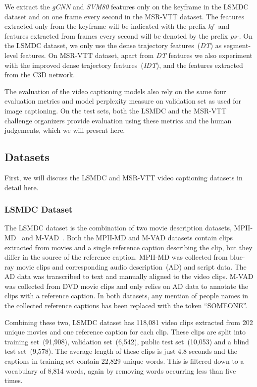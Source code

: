 We extract the \emph{gCNN} and \emph{SVM80} features only on the keyframe in the LSMDC
dataset and on one frame every second in the MSR-VTT dataset.
The features extracted only from the keyframe will be indicated with the prefix
\emph{kf-} and features extracted from frames every second will be denoted by
the prefix \emph{ps-}.
On the LSMDC dataset, we only use the dense trajectory features~(\emph{DT}) as
segment-level features.
On MSR-VTT dataset, apart from \emph{DT} features we also experiment with
the improved dense trajectory features~(\emph{IDT}), and the features extracted from
the C3D network.

The evaluation of the video captioning models also rely on the same four
evaluation metrics and model perplexity measure on validation set as used for
image captioning. 
On the test sets, both the LSMDC and the MSR-VTT challenge organizers provide
evaluation using these metrics and the human judgements, which we will present
here.

\subsection{Datasets}
First, we will discuss the LSMDC and MSR-VTT video captioning datasets in detail
here.
\subsubsection{LSMDC Dataset}
\label{subsec:LsmdcData}
The LSMDC dataset is the combination of two movie description datasets,
MPII-MD~\cite{rohrbach15cvpr} and M-VAD~\cite{AtorabiM-VAD2015}.
Both the MPII-MD and M-VAD datasets contain clips extracted from movies and a
single reference caption describing the clip, but they differ in the source of
the reference caption.
MPII-MD was collected from blue-ray movie clips and corresponding audio
description~(AD) and script data.
The AD data was transcribed to text and manually aligned to the video clips.
M-VAD was collected from DVD movie clips and only relies on AD data to annotate
the clips with a reference caption.
In both datasets, any mention of people names in the collected reference
captions has been replaced with the token ``SOMEONE''.

Combining these two, LSMDC dataset has 118,081 video clips extracted from 202
unique movies and one reference caption for each clip.
These clips are split into training set~(91,908), validation set~(6,542), public
test set~(10,053) and a blind test set~(9,578).
The average length of these clips is just 4.8 seconds and the captions in
training set contain 22,829 unique words.
This is filtered down to a vocabulary of 8,814 words, again by removing words
occurring less than five times.

